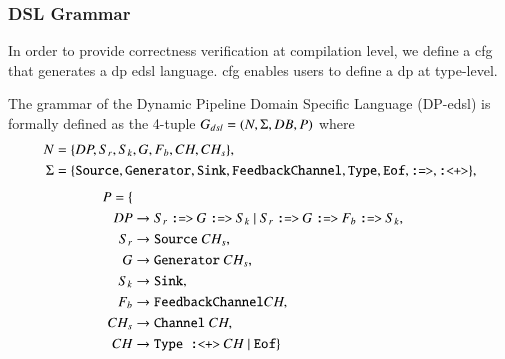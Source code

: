 \subsubsection{DSL Grammar}\label{sub:sec:dsl-gram}
In order to provide correctness verification at compilation level, we define a \acrfull{cfg} that generates a \acrshort{dp} \acrshort{edsl} language. 
\acrshort{cfg} enables users to define a \acrshort{dp} at type-level. 
\fi
%
\begin{definition}\label{def:cfg:dsl}
The grammar of the Dynamic Pipeline Domain Specific Language (DP-\acrshort{edsl}) is formally defined as the 4-tuple $G_{dsl} = (N, \Sigma, DB, P)$ where
\begin{equation*}\label{grammar:eq}
      \begin{aligned}
    N &= \{DP,S_r,S_k,G,F_b,CH,CH_s\},\\
    \Sigma &= \{\text{\texttt{Source}},\text{\texttt{Generator}},\text{\texttt{Sink}},\text{\texttt{FeedbackChannel}},\text{\texttt{Type}},\text{\texttt{Eof}},\text{\texttt{:=>}},\text{\texttt{:<+>}}\},
    \end{aligned}
\end{equation*}
\begin{equation*}
    \begin{aligned}
  P = \{\\
  DP  &\rightarrow S_r\ \text{\texttt{:=>}}\ G\ \text{\texttt{:=>}}\ S_k\ |\ S_r\ \text{\texttt{:=>}}\ G\ \text{\texttt{:=>}}\ F_b\ \text{\texttt{:=>}}\ S_k,\\
  S_r &\rightarrow \text{\texttt{Source}}\ CH_s,\\
  G   &\rightarrow \text{\texttt{Generator}}\ CH_s,\\
  S_k &\rightarrow \text{\texttt{Sink}},\\
  F_b &\rightarrow \text{\texttt{FeedbackChannel}} CH,\\
  CH_s &\rightarrow \text{\texttt{Channel}}\ CH,\\
  CH &\rightarrow \text{\texttt{Type :<+>}}\ CH\ |\ \text{\texttt{Eof}}\}
\end{aligned}
\end{equation*}
\end{definition}
